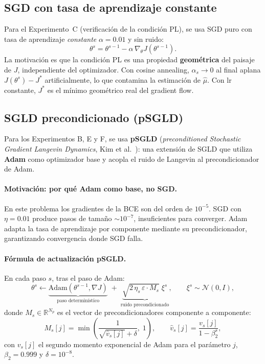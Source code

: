 \documentclass[11pt, a4paper]{article}
\theoremstyle{definition}
\newcommand{\R}{\mathbb{R}}
\begin{document}
\subsection{SGD con tasa de aprendizaje constante}
\label{sec:sgd}

Para el Experimento~C (verificación de la condición PL), se usa SGD puro con
tasa de aprendizaje \emph{constante} $\alpha = 0.01$ y sin ruido:
\begin{equation}
  \theta^s = \theta^{s-1} - \alpha\, \nabla_\theta J(\theta^{s-1}).
\end{equation}
La motivación es que la condición PL es una propiedad \textbf{geométrica} del
paisaje de $J$, independiente del optimizador. Con cosine annealing,
$\alpha_s \to 0$ al final aplana $J(\theta^s) - J^*$ artificialmente, lo que
contamina la estimación de $\hat{\mu}$. Con lr constante, $J^*$ es el mínimo
geométrico real del gradient flow.

\subsection{SGLD precondicionado (pSGLD)}
\label{sec:sgld}

Para los Experimentos B, E y F, se usa \textbf{pSGLD} (\emph{preconditioned
Stochastic Gradient Langevin Dynamics}, Kim et al.~\cite{li2016psgld}):
una extensión de SGLD que utiliza \textbf{Adam} como optimizador base y
acopla el ruido de Langevin al precondicionador de Adam.

\paragraph{Motivación: por qué Adam como base, no SGD.}
En este problema los gradientes de la BCE son del orden de $10^{-5}$.
SGD con $\eta = 0.01$ produce pasos de tamaño $\sim 10^{-7}$, insuficientes
para converger. Adam adapta la tasa de aprendizaje por componente mediante su
precondicionador, garantizando convergencia donde SGD falla.

\paragraph{Fórmula de actualización pSGLD.}
En cada paso $s$, tras el paso de Adam:
\begin{equation}
  \label{eq:psgld}
  \theta^s \leftarrow \underbrace{\text{Adam}(\theta^{s-1}, \nabla J)}_{\text{paso determinístico}}
  \;+\; \underbrace{\sqrt{2\,\eta_s\,\varepsilon \cdot M_s}\;\xi^s}_{\text{ruido precondicionado}},
  \qquad \xi^s \sim \mathcal{N}(0, I),
\end{equation}
donde $M_s \in \R^{N_p}$ es el vector de precondicionadores componente a
componente:
\begin{equation}
  \label{eq:precond}
  M_s[j] = \min\!\left(\frac{1}{\sqrt{\hat{v}_s[j]} + \delta},\; 1\right),
  \qquad
  \hat{v}_s[j] = \frac{v_s[j]}{1 - \beta_2^s},
\end{equation}
con $v_s[j]$ el segundo momento exponencial de Adam para el parámetro $j$,
$\beta_2 = 0.999$ y $\delta = 10^{-8}$.
\end{document}
